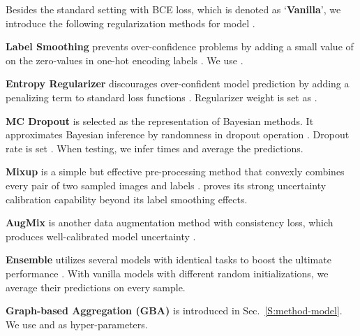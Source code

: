 \documentclass[runningheads]{llncs}
\begin{document}
Besides the standard setting with BCE loss, which is denoted as `\textbf{Vanilla}', we introduce the following  regularization methods for model .

\textbf{Label Smoothing} prevents over-confidence problems by adding a small value of  on the zero-values in one-hot encoding labels \cite{szegedy2016rethinking}. We use .

\textbf{Entropy Regularizer} discourages over-confident model prediction by adding a penalizing term to standard loss functions \cite{pereyra2017regularizing}. Regularizer weight is set as .

\textbf{MC Dropout} is selected as the representation of Bayesian methods. It approximates Bayesian inference by randomness in dropout operation \cite{gal2016dropout}. Dropout rate  is set . When testing, we infer  times and average the predictions.

\textbf{Mixup} is a simple but effective pre-processing method that convexly combines every pair of two sampled images and labels \cite{zhang2018mixup}. 
\cite{thulasidasan2019mixup} proves its strong uncertainty calibration capability beyond its label smoothing effects.

\textbf{AugMix} is another data augmentation method with consistency loss, which produces well-calibrated model uncertainty \cite{hendrycks2020augmix}.

\textbf{Ensemble} utilizes several models with identical tasks to boost the ultimate performance \cite{dietterich2000ensemble}. With  vanilla models with different random initializations, we average their predictions on every sample.

\textbf{Graph-based Aggregation (GBA)} is introduced in Sec.~\ref{S:method-model}. We use  and  as hyper-parameters.
	
\end{document}
